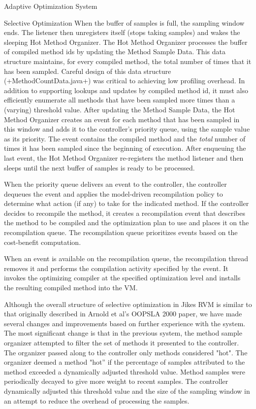 \begin{chapter}{Adaptive Optimization System}
\begin{paragraph}{Selective Optimization}
When the buffer of samples is full, the sampling window ends. The listener then unregisters itself (stops taking samples) and wakes the sleeping Hot Method Organizer.  The Hot Method Organizer processes the buffer of compiled method ids by updating the Method Sample Data.  This data structure maintains, for every compiled method, the total number of times that it has been sampled. Careful design of this data structure (\spverb+MethodCountData.java+) was critical to achieving low profiling overhead. In addition to supporting lookups and updates by compiled method id, it must also efficiently enumerate all methods that have been sampled more times than a (varying) threshold value. After updating the Method Sample Data, the Hot Method Organizer creates an event for each method that has been sampled in this window and adds it to the controller's priority queue, using the sample value as its priority. The event contains the compiled method and the \textit{total} number of times it has been sampled  since the beginning of execution.  After enqueuing the last event, the Hot Method Organizer re-registers the method listener and then sleeps until the next buffer of samples is ready to be processed.

When the priority queue delivers an event to the controller, the controller dequeues the event and applies the model-driven recompilation policy to determine what action (if any) to take for the indicated method.  If the controller decides to recompile the method, it creates a recompilation event that describes the method to be compiled and the optimization plan to use and places it on the recompilation queue. The recompilation queue prioritizes events based on the cost-benefit computation.

When an event is available on the recompilation queue, the recompilation thread removes it and performs the compilation activity specified by the event. It invokes the optimizing compiler at the specified optimization level and installs the resulting compiled method into the VM. 

Although the overall structure of selective optimization in Jikes RVM is similar to that originally described in Arnold et al's OOPSLA 2000 paper, we have made several changes and improvements based on further experience with the system. The most significant change is that in the previous system, the method sample organizer attempted to filter the set of methods it presented to the controller.  The organizer passed along to the controller only methods considered "hot".  The organizer deemed a method "hot'' if the percentage of samples attributed to the method exceeded a dynamically adjusted threshold value. Method samples were periodically decayed to give more weight to recent samples. The controller dynamically adjusted this threshold value and the size of the sampling window in an attempt to reduce the overhead of processing the samples.


\end{paragraph}
\end{chapter}
